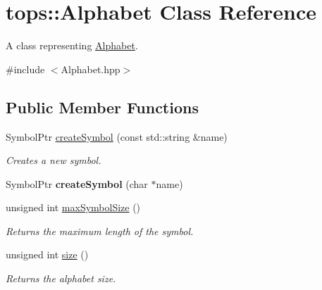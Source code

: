 \hypertarget{classtops_1_1Alphabet}{}\section{tops\+:\+:Alphabet Class Reference}
\label{classtops_1_1Alphabet}


A class representing \hyperlink{classtops_1_1Alphabet}{Alphabet}.  




{\ttfamily \#include $<$Alphabet.\+hpp$>$}

\subsection*{Public Member Functions}
\begin{DoxyCompactItemize}
\item 
Symbol\+Ptr \hyperlink{classtops_1_1Alphabet_ae82947c05a15225d90a93547d26c10b0}{create\+Symbol} (const std\+::string \&name)
\begin{DoxyCompactList}\small\item\em Creates a new symbol. \end{DoxyCompactList}\item 
\mbox{\label{classtops_1_1Alphabet_a559fdaf75922ccb4927ad868822c9305}} 
Symbol\+Ptr {\bfseries create\+Symbol} (char $\ast$name)
\item 
\mbox{\label{classtops_1_1Alphabet_ad72e398ac3123f76c978e3c41e61e959}} 
unsigned int \hyperlink{classtops_1_1Alphabet_ad72e398ac3123f76c978e3c41e61e959}{max\+Symbol\+Size} ()
\begin{DoxyCompactList}\small\item\em Returns the maximum length of the symbol. \end{DoxyCompactList}\item 
\mbox{\label{classtops_1_1Alphabet_a0ecfdfad56bda227522acb504b20c20e}} 
unsigned int \hyperlink{classtops_1_1Alphabet_a0ecfdfad56bda227522acb504b20c20e}{size} ()
\begin{DoxyCompactList}\small\item\em Returns the alphabet size. \end{DoxyCompactList}\item 
\mbox{\label{classtops_1_1Alphabet_ada9bbe4368c00ca714b99ba49bd9d350}} 

\end{DoxyCompactItemize}
